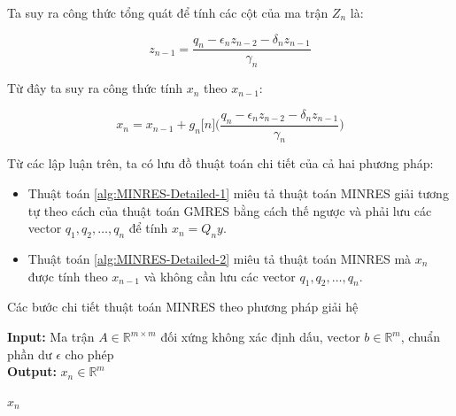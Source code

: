 \documentclass[14pt, a4paper]{article}
\numberwithin{equation}{section}
\numberwithin{algorithm}{section}
\numberwithin{figure}{section}
\numberwithin{dl}{section}
\numberwithin{md}{section}
\numberwithin{bd}{section}
\numberwithin{dn}{section}
\begin{document}
Ta suy ra công thức tổng quát để tính các cột của ma trận $Z_n$ là:

\begin{equation}
	z_{n-1} = \dfrac{q_n - \epsilon_n z_{n-2} - \delta_n z_{n-1}}{\gamma_n}
\end{equation}

Từ đây ta suy ra công thức tính $x_n$ theo $x_{n-1}$:

\begin{equation}
    x_n = x_{n-1} + g_n\lbrack n \rbrack \Big(\dfrac{q_n - \epsilon_n z_{n-2} - \delta_n z_{n-1}}{\gamma_n}\Big)
\end{equation}

Từ các lập luận trên, ta có lưu đồ thuật toán chi tiết của cả hai phương pháp:

\begin{itemize}
    \item Thuật toán \ref{alg:MINRES-Detailed-1} miêu tả thuật toán MINRES giải tương tự theo cách của thuật toán GMRES bằng cách thế ngược và phải lưu các vector $q_1, q_2, \dots, q_n$ để tính $x_n = Q_n y$.
    \item Thuật toán \ref{alg:MINRES-Detailed-2} miêu tả thuật toán MINRES mà $x_n$ được tính theo $x_{n-1}$ và không cần lưu các vector $q_1, q_2, \dots, q_n$.
\end{itemize}

\begin{algorithm}
    \caption{Các bước chi tiết thuật toán MINRES theo phương pháp giải hệ}\label{alg:MINRES-Detailed-1}
    \hspace*{\algorithmicindent} \textbf{Input:} {Ma trận $A \in \mathbb{R}^{m \times m}$ đối xứng không xác định dấu, vector $b \in \mathbb{R}^m$, chuẩn phần dư $\epsilon$ cho phép} \\
    \hspace*{\algorithmicindent} \textbf{Output:} {$x_n \in \mathbb{R}^m$}
    \begin{algorithmic}
                \State \Return $x_n$
            \EndIf
        \EndFor
    \end{algorithmic}
\end{algorithm}
\end{document}
